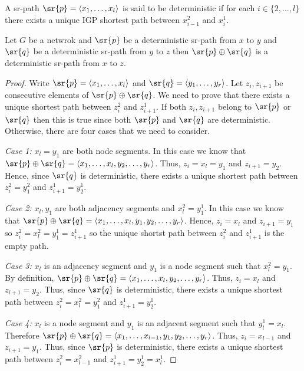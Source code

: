 \begin{definition}
A sr-path $\sr{p} = \langle x_1, \ldots, x_l \rangle$ is said to be deterministic if for each $i \in \{2, \ldots, l\}$
there exists a unique IGP shortest path between $x^2_{i - 1}$ and $x^1_i$.
\end{definition}

\begin{lemma}
\label{lemma:deterministic-concat}
Let $G$ be a netwrok and $\sr{p}$ be a deterministic sr-path from
$x$ to $y$ and $\sr{q}$ be a deterministic sr-path from $y$ to $z$ 
then $\sr{p} \oplus \sr{q}$ is a deterministic sr-path
from $x$ to $z$.
\end{lemma}

\begin{proof}
Write $\sr{p} = \langle x_1, \ldots, x_l \rangle$ and 
$\sr{q} = \langle y_1, \ldots, y_r \rangle$.
Let $z_i, z_{i + 1}$ be consecutive elements of $\sr{p} \oplus \sr{q}$. 
We need to prove that
there exists a unique shortest path between $z^2_i$ and $z^1_{i + 1}$.
If both $z_i, z_{i + 1}$ belong to $\sr{p}$ or $\sr{q}$ then this is true since both
$\sr{p}$ and $\sr{q}$ are deterministic. Otherwise, there are four cases that we need
to consider.

\emph{Case 1:} $x_l = y_1$ are both node segments. In this case we know that
$\sr{p} \oplus \sr{q} = \langle x_1, \ldots, x_l, y_2, \ldots, y_r \rangle$.
Thus, $z_i = x_l = y_1$ and $z_{i + 1} = y_2$. Hence, since $\sr{q}$ is deterministic,
there exists a unique shortest path between $z^2_i = y^2_1$ and $z^1_{i + 1} = y^1_2$.

\emph{Case 2:} $x_l,  y_1$ are both adjacency segments and 
$x^2_l = y^1_1$. In this case we know that
$\sr{p} \oplus \sr{q} = \langle x_1, \ldots, x_l, y_1, y_2, \ldots, y_r \rangle$.
Hence, $z_i = x_l$ and $z_{i + 1} = y_1$ so $z^2_i = x^2_l = y^1_1 = z^1_{i + 1}$ so
the unique shortst path between $z^2_i$ and $z^1_{i + 1}$ is the empty path.

\emph{Case 3:} $x_l$ is an adjacency segment and $y_1$ is a node segment such that
$x^2_l = y_1$. By definition, 
$\sr{p} \oplus \sr{q} = \langle x_1, \ldots, x_l, y_2, \ldots, y_r \rangle$.
Thus, $z_i = x_l$ and $z_{i + 1} = y_2$. Thus, since $\sr{q}$ is deterministic,
there exists a unique shortest path between $z^2_i = x^2_l = y^2_1$ and $z^1_{i + 1} = y^1_2$.

\emph{Case 4:} $x_l$ is a node segment and $y_1$ is an adjacent segment such that
$y^1_l = x_l$. Therefore $\sr{p} \oplus \sr{q} = \langle x_1, \ldots, x_{l - 1}, y_1, y_2, \ldots, y_r \rangle$.
Thus, $z_i = x_{l - 1}$ and $z_{i + 1} = y_1$. Thus, since $\sr{p}$ is deterministic,
there exists a unique shortest path between $z^2_i = x^2_{l - 1}$ and $z^1_{i + 1} = y^1_2 = x^1_l$.
\end{proof}



